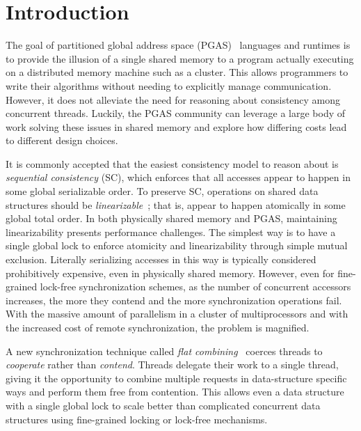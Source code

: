 \section{Introduction}
The goal of partitioned global address space (PGAS)~\cite{upc:2005} languages and runtimes is to provide the illusion of a single shared memory to a program actually executing on a distributed memory machine such as a cluster. This allows programmers to write their algorithms without needing to explicitly manage communication.
However, it does not alleviate the need for reasoning about consistency among concurrent threads.
Luckily, the PGAS community can leverage a large body of work solving these issues in shared memory and explore how differing costs lead to different design choices.

It is commonly accepted that the easiest consistency model to reason about is \emph{sequential consistency} (SC), which enforces that all accesses appear to happen in some global serializable order.
To preserve SC, operations on shared data structures should be \emph{linearizable}~\cite{herlihy1990linearizability}; that is, appear to happen atomically in some global total order.
In both physically shared memory and PGAS, maintaining linearizability presents performance challenges.
The simplest way is to have a single global lock to enforce atomicity and linearizability through simple mutual exclusion. Literally serializing accesses in this way is typically considered prohibitively expensive, even in physically shared memory.
However, even for fine-grained lock-free synchronization schemes, as the number of concurrent accessors increases, the more they contend and the more synchronization operations fail.
With the massive amount of parallelism in a cluster of multiprocessors and with the increased cost of remote synchronization, the problem is magnified.

A new synchronization technique called \emph{flat combining}~\cite{flatCombining} coerces threads to \emph{cooperate} rather than \emph{contend}.
Threads delegate their work to a single thread, giving it the opportunity to combine multiple requests in data-structure specific ways and perform them free from contention.
This allows even a data structure with a single global lock to scale better than complicated concurrent data structures using fine-grained locking or lock-free mechanisms.

